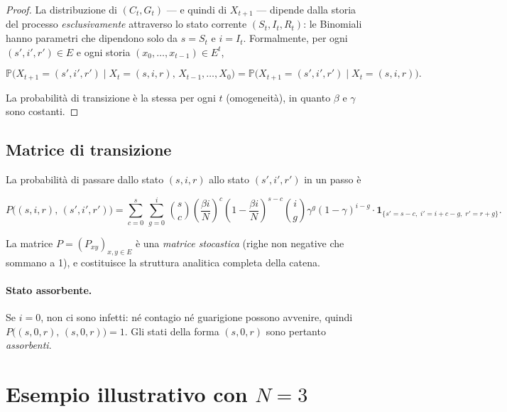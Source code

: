 \documentclass[11pt, a4paper]{article}
\theoremstyle{plain}
\theoremstyle{definition}
\theoremstyle{remark}
\newcommand{\Prob}{\mathbb{P}}
\begin{document}
\begin{proof}
  La distribuzione di $(C_t, G_t)$ — e quindi di $X_{t+1}$ —
  dipende dalla storia del processo \emph{esclusivamente} attraverso lo stato corrente
  $(S_t, I_t, R_t)$: le Binomiali hanno parametri che dipendono solo da $s = S_t$ e $i = I_t$.
  Formalmente, per ogni $(s', i', r') \in E$ e ogni storia
  $(x_0, \ldots, x_{t-1}) \in E^t$,

  \[
    \Prob\!\bigl(X_{t+1} = (s',i',r') \mid X_t = (s,i,r),\, X_{t-1},\ldots,X_0\bigr)
    = \Prob\!\bigl(X_{t+1} = (s',i',r') \mid X_t = (s,i,r)\bigr).
  \]

  La probabilità di transizione è la stessa per ogni $t$ (omogeneità), in quanto
  $\beta$ e $\gamma$ sono costanti.
\end{proof}

\subsection{Matrice di transizione}

La probabilità di passare dallo stato $(s, i, r)$ allo stato $(s', i', r')$ in un passo è

\begin{equation}\label{eq:matrice_P}
  P\!\bigl((s,i,r),\, (s',i',r')\bigr)
  = \sum_{c=0}^{s}\, \sum_{g=0}^{i}\,
    \binom{s}{c}\!\left(\frac{\beta i}{N}\right)^{\!c}\!\left(1 - \frac{\beta i}{N}\right)^{\!s-c}
    \binom{i}{g} \gamma^g (1-\gamma)^{i-g}
    \cdot \mathbf{1}_{\{s' = s-c,\; i' = i+c-g,\; r' = r+g\}}.
\end{equation}

La matrice $P = (P_{xy})_{x,y \in E}$ è una \emph{matrice stocastica} (righe non negative
che sommano a 1), e costituisce la struttura analitica completa della catena.

\paragraph{Stato assorbente.}
Se $i = 0$, non ci sono infetti: né contagio né guarigione possono avvenire, quindi
$P\!\bigl((s,0,r),\,(s,0,r)\bigr) = 1$. Gli stati della forma $(s, 0, r)$ sono pertanto
\emph{assorbenti}.

\section{Esempio illustrativo con \texorpdfstring{$N = 3$}{N=3}}
\label{sec:esempio}
\end{document}
